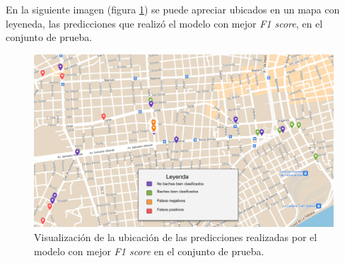 	En la siguiente imagen (figura \ref{fig:14}) se puede apreciar ubicados en un mapa con leyeneda, las predicciones que realizó el modelo con mejor 
	\emph{F1 score}, en el conjunto de prueba.

	\newpage
	\begin{figure}[htb]
		\centering
		\includegraphics[scale = 0.4]{Graphics/map_point_predictions.png}
		\caption{Visualización de la ubicación de las predicciones realizadas por el modelo con mejor \emph{F1 score} en el conjunto de prueba.}
		\label{fig:14}
	\end{figure}
